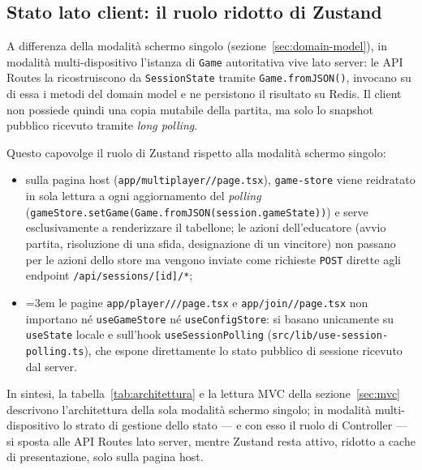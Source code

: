 \documentclass[12pt]{report}
\begin{document}
\subsection{Stato lato client: il ruolo ridotto di Zustand}
\label{sec:multi-dispositivo-stato-client}

A differenza della modalità schermo singolo (sezione~\ref{sec:domain-model}), in modalità multi-dispositivo l'istanza di \texttt{Game} autoritativa vive lato server: le API Routes la ricostruiscono da \texttt{SessionState} tramite \texttt{Game.fromJSON()}, invocano su di essa i metodi del domain model e ne persistono il risultato su Redis. Il client non possiede quindi una copia mutabile della partita, ma solo lo snapshot pubblico ricevuto tramite \textit{long polling}.

Questo capovolge il ruolo di Zustand rispetto alla modalità schermo singolo:

\begin{itemize}
    \item sulla pagina host (\texttt{app/\allowbreak multiplayer/\allowbreak[sessionId]/\allowbreak page.tsx}), \texttt{game-store} viene reidratato in sola lettura a ogni aggiornamento del \textit{polling} (\texttt{gameStore.\allowbreak setGame(\allowbreak Game.\allowbreak fromJSON(\allowbreak session.\allowbreak gameState))}) e serve esclusivamente a renderizzare il tabellone; le azioni dell'educatore (avvio partita, risoluzione di una sfida, designazione di un vincitore) non passano per le azioni dello store ma vengono inviate come richieste \texttt{POST} dirette agli endpoint \texttt{/api/sessions/[id]/*};
    \item \emergencystretch=3em le pagine \texttt{app/\allowbreak player/\allowbreak[sessionId]/\allowbreak[playerId]/\allowbreak page.tsx} e \texttt{app/\allowbreak join/\allowbreak[sessionId]/\allowbreak page.tsx} non importano né \texttt{useGameStore} né \texttt{useConfigStore}: si basano unicamente su \texttt{useState} locale e sull'hook \texttt{useSessionPolling} (\texttt{src/\allowbreak lib/\allowbreak use-session-polling.ts}), che espone direttamente lo stato pubblico di sessione ricevuto dal server.
\end{itemize}

In sintesi, la tabella~\ref{tab:architettura} e la lettura MVC della sezione~\ref{sec:mvc} descrivono l'architettura della sola modalità schermo singolo; in modalità multi-dispositivo lo strato di gestione dello stato --- e con esso il ruolo di Controller --- si sposta alle API Routes lato server, mentre Zustand resta attivo, ridotto a cache di presentazione, solo sulla pagina host.
\end{document}
